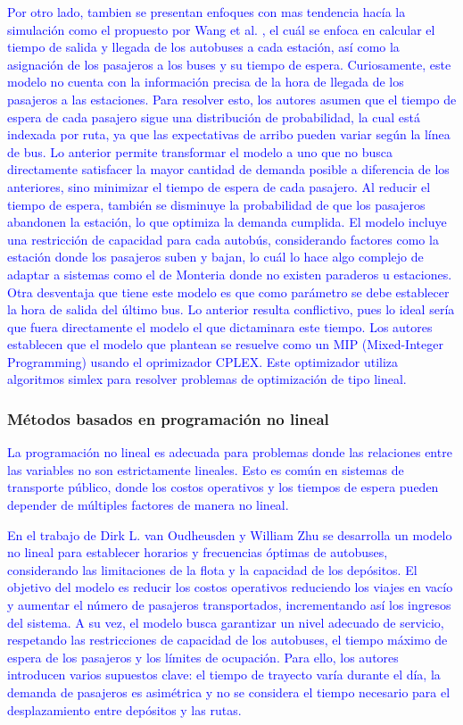 \documentclass[preprint,11pt]{elsarticle}
\newcommand{\Blue}[1]{\textcolor{blue}{#1}}
\begin{document}
\Blue{
Por otro lado, tambien se presentan enfoques con mas tendencia hacía la simulación como el propuesto por Wang et al. \cite{wang2017}, el cuál se enfoca en calcular el tiempo de salida y llegada de los autobuses a cada estación, así como la asignación de los pasajeros a los buses y su tiempo de espera. Curiosamente, este modelo no cuenta con la información precisa de la hora de llegada de los pasajeros a las estaciones. Para resolver esto, los autores asumen que el tiempo de espera de cada pasajero sigue una distribución de probabilidad, la cual está indexada por ruta, ya que las expectativas de arribo pueden variar según la línea de bus. Lo anterior permite transformar el modelo a uno que no busca directamente satisfacer la mayor cantidad de demanda posible a diferencia de los anteriores, sino minimizar el tiempo de espera de cada pasajero. Al reducir el tiempo de espera, también se disminuye la probabilidad de que los pasajeros abandonen la estación, lo que optimiza la demanda cumplida\cite{wang2017}. El modelo incluye una restricción de capacidad para cada autobús, considerando factores como la estación donde los pasajeros suben y bajan, lo cuál lo hace algo complejo de adaptar a sistemas como el de Monteria donde no existen paraderos u estaciones. Otra desventaja que tiene este modelo es que como parámetro se debe establecer la hora de salida del último bus. Lo anterior resulta conflictivo, pues lo ideal sería que fuera directamente el modelo el que dictaminara este tiempo. Los autores establecen que el modelo que plantean se resuelve como un MIP (Mixed-Integer Programming) usando el oprimizador CPLEX. Este optimizador utiliza algoritmos simlex para resolver problemas de optimización de tipo lineal.} 



\subsubsection{Métodos basados en programación no lineal}
\Blue{La programación no lineal es adecuada para problemas donde las relaciones entre las variables no son estrictamente lineales. Esto es común en sistemas de transporte público, donde los costos operativos y los tiempos de espera pueden depender de múltiples factores de manera no lineal.}

\Blue{En el trabajo de Dirk L. van Oudheusden y William Zhu \cite{vanoudheusden1995} se desarrolla un modelo no lineal para establecer horarios y frecuencias óptimas de autobuses, considerando las limitaciones de la flota y la capacidad de los depósitos. El objetivo del modelo es reducir los costos operativos reduciendo los viajes en vacío y aumentar el número de pasajeros transportados, incrementando así los ingresos del sistema. A su vez, el modelo busca garantizar un nivel adecuado de servicio, respetando las restricciones de capacidad de los autobuses, el tiempo máximo de espera de los pasajeros y los límites de ocupación. Para ello, los autores introducen varios supuestos clave: el tiempo de trayecto varía durante el día, la demanda de pasajeros es asimétrica y no se considera el tiempo necesario para el desplazamiento entre depósitos y las rutas.}
\end{document}
